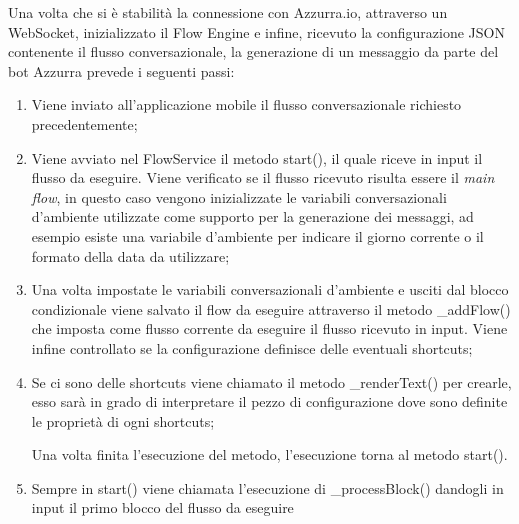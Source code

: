 Una volta che si è stabilità la connessione con Azzurra.io, attraverso un \gls{WebSocket}\ap{[g]}, inizializzato il Flow Engine e infine, ricevuto la configurazione JSON contenente il flusso conversazionale, la generazione di un messaggio da parte del \gls{bot}\ap{[g]} Azzurra prevede i seguenti passi:\\
\begin{enumerate}
	\item Viene inviato all’applicazione mobile il flusso conversazionale richiesto precedentemente;
	\item Viene avviato nel FlowService il metodo start(), il quale riceve in input il flusso da eseguire. Viene verificato se il flusso ricevuto risulta essere il \emph{main flow}, in questo caso vengono inizializzate le variabili conversazionali d'ambiente utilizzate come supporto per la generazione dei messaggi, ad esempio esiste una variabile d'ambiente per indicare il giorno corrente o il formato della data da utilizzare;
	\item Una volta impostate le variabili conversazionali d’ambiente e usciti dal blocco condizionale viene salvato il flow da eseguire attraverso il metodo \_addFlow() che imposta come flusso corrente da eseguire il flusso ricevuto in input. Viene infine controllato se la configurazione definisce delle eventuali shortcuts;
	\item Se ci sono delle shortcuts viene chiamato il metodo \_renderText() per crearle, esso sarà in grado di interpretare il pezzo di configurazione dove sono definite le proprietà di ogni shortcuts;
	
	Una volta finita l'esecuzione del metodo, l'esecuzione torna al metodo start().
	\item Sempre in start() viene chiamata l'esecuzione di \_processBlock() dandogli in input il primo blocco del flusso da eseguire
	

\end{enumerate}
